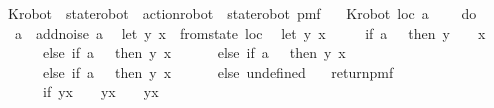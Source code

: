 \begin{isabellebody}
\isanewline
{}\isamarkupfalse%
\ K{\isacharunderscore}{\kern0pt}robot\ {\isacharcolon}{\kern0pt}{\isacharcolon}{\kern0pt}\ {\isachardoublequoteopen}{\isacharparenleft}{\kern0pt}state{\isacharunderscore}{\kern0pt}robot\ {\isasymtimes}\ action{\isacharunderscore}{\kern0pt}robot{\isacharparenright}{\kern0pt}\ {\isasymRightarrow}\ state{\isacharunderscore}{\kern0pt}robot\ pmf{\isachardoublequoteclose}\ \isanewline
\ \ {\isachardoublequoteopen}K{\isacharunderscore}{\kern0pt}robot\ {\isacharparenleft}{\kern0pt}loc{\isacharcomma}{\kern0pt}\ a{\isacharparenright}{\kern0pt}\ {\isacharequal}{\kern0pt}\ \isanewline
\ \ do\ {\isacharbraceleft}{\kern0pt}\isanewline
\ \ a\ {\isasymleftarrow}\ add{\isacharunderscore}{\kern0pt}noise\ a{\isacharsemicolon}{\kern0pt}\isanewline
\ \ let\ {\isacharparenleft}{\kern0pt}y{\isacharcomma}{\kern0pt}\ x{\isacharparenright}{\kern0pt}\ {\isacharequal}{\kern0pt}\ from{\isacharunderscore}{\kern0pt}state\ loc{\isacharsemicolon}{\kern0pt}\isanewline
\ \ let\ {\isacharparenleft}{\kern0pt}y{\isacharprime}{\kern0pt}{\isacharcomma}{\kern0pt}\ x{\isacharprime}{\kern0pt}{\isacharparenright}{\kern0pt}\ {\isacharequal}{\kern0pt}\isanewline
\ \ \ \ {\isacharparenleft}{\kern0pt}if\ a\ {\isacharequal}{\kern0pt}\ {}\ then\ {\isacharparenleft}{\kern0pt}y\ {\isacharplus}{\kern0pt}\ {}\ {\isacharcomma}{\kern0pt}\ x{\isacharparenright}{\kern0pt}\isanewline
\ \ \ \ \ \ else\ if\ a\ {\isacharequal}{\kern0pt}\ {}\ then\ {\isacharparenleft}{\kern0pt}y{\isacharcomma}{\kern0pt}\ x{\isacharplus}{\kern0pt}{}{\isacharparenright}{\kern0pt}\isanewline
\ \ \ \ \ \ else\ if\ a\ {\isacharequal}{\kern0pt}\ {}\ then\ {\isacharparenleft}{\kern0pt}y{\isacharminus}{\kern0pt}{}{\isacharcomma}{\kern0pt}\ x{\isacharparenright}{\kern0pt}\isanewline
\ \ \ \ \ \ else\ if\ a\ {\isacharequal}{\kern0pt}\ {}\ then\ {\isacharparenleft}{\kern0pt}y{\isacharcomma}{\kern0pt}\ x{\isacharminus}{\kern0pt}{}{\isacharparenright}{\kern0pt}\isanewline
\ \ \ \ \ \ else\ undefined{\isacharparenright}{\kern0pt}{\isacharsemicolon}{\kern0pt}\isanewline
\ \ \ return{\isacharunderscore}{\kern0pt}pmf\ {\isacharparenleft}{\kern0pt}\isanewline
\ \ \ \ \ \ if\ {\isacharparenleft}{\kern0pt}y{\isacharcomma}{\kern0pt}x{\isacharparenright}{\kern0pt}\ {\isacharequal}{\kern0pt}\ {\isacharparenleft}{\kern0pt}{}{\isacharcomma}{\kern0pt}{}{\isacharparenright}{\kern0pt}\ {\isasymor}\ {\isacharparenleft}{\kern0pt}y{\isacharcomma}{\kern0pt}x{\isacharparenright}{\kern0pt}\ {\isacharequal}{\kern0pt}\ {\isacharparenleft}{\kern0pt}{}{\isacharcomma}{\kern0pt}{}{\isacharparenright}{\kern0pt}\ {\isasymor}\ {\isacharparenleft}{\kern0pt}y{\isacharcomma}{\kern0pt}x{\isacharparenright}{\kern0pt}\ {\isacharequal}{\kern0pt}\ {\isacharparenleft}{\kern0pt}{}{\isacharcomma}{\kern0pt}{}{\isacharparenright}{\kern0pt}\ \isanewline

\end{isabellebody}
